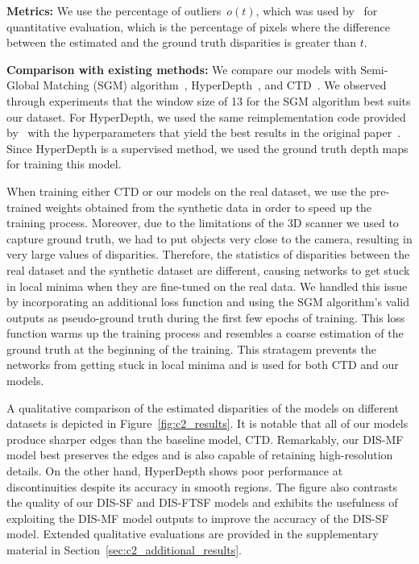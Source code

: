\bigbreak\noindent\textbf{Metrics:} We use the percentage of outliers~$o(t)$, which was used by~\cite{riegler2019connecting} for quantitative evaluation, which is the percentage of pixels where the difference between the estimated and the ground truth disparities is greater than $t$.

\bigbreak\noindent\textbf{Comparison with existing methods:} We compare our models with Semi-Global Matching (SGM) algorithm~\citep{hirschmuller2007stereo}, HyperDepth~\citep{ryan2016hyperdepth}, and CTD~\citep{riegler2019connecting}. We observed through experiments that the window size of 13 for the SGM algorithm best suits our dataset. For HyperDepth, we used the same reimplementation code provided by~\cite{riegler2019connecting} with the hyperparameters that yield the best results in the original paper~\citep{ryan2016hyperdepth}. Since HyperDepth is a supervised method, we used the ground truth depth maps for training this model.

When training either CTD or our models on the real dataset, we use the pre-trained weights obtained from the synthetic data in order to speed up the training process. Moreover, due to the limitations of the 3D scanner we used to capture ground truth, we had to put objects very close to the camera, resulting in very large values of disparities. Therefore, the statistics of disparities between the real dataset and the synthetic dataset are different, causing networks to get stuck in local minima when they are fine-tuned on the real data. We handled this issue by incorporating an additional loss function and using the SGM algorithm's valid outputs as pseudo-ground truth during the first few epochs of training. This loss function warms up the training process and resembles a coarse estimation of the ground truth at the beginning of the training. This stratagem prevents the networks from getting stuck in local minima and is used for both CTD and our models.

A qualitative comparison of the estimated disparities of the models on different datasets is depicted in Figure~\ref{fig:c2_results}. It is notable that all of our models produce sharper edges than the baseline model, CTD. Remarkably, our DIS-MF model best preserves the edges and is also capable of retaining high-resolution details. On the other hand, HyperDepth shows poor performance at discontinuities despite its accuracy in smooth regions. The figure also contrasts the quality of our DIS-SF and DIS-FTSF models and exhibits the usefulness of exploiting the DIS-MF model outputs to improve the accuracy of the DIS-SF model. Extended qualitative evaluations are provided in the supplementary material in Section~\ref{sec:c2_additional_results}.

